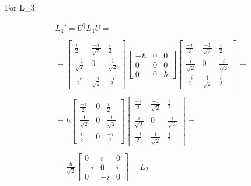 For L_3:

\begin{equation}
  \begin{array}{c}
    L_3' = U^\dagger L_3 U =
    \\

    \\
    = \left[\begin{matrix}
      \frac{i}{2} & \frac{-i}{\sqrt{2}} & \frac{i}{2}\\
      \frac{-1}{\sqrt{2}} & 0 & \frac{1}{\sqrt{2}}\\
      \frac{-i}{2} & \frac{-i}{\sqrt{2}} & \frac{-i}{2}
    \end{matrix}\right]
    \left[\begin{matrix}
      -\hbar & 0 & 0\\
      0 & 0 & 0\\
      0 & 0 & \hbar
    \end{matrix}\right]
    \left[\begin{matrix}
      \frac{-i}{2} & \frac{-1}{\sqrt{2}} & \frac{i}{2}\\
      \frac{i}{\sqrt{2}} & 0 & \frac{i}{\sqrt{2}}\\
      \frac{-i}{2} & \frac{1}{\sqrt{2}} & \frac{i}{2}
    \end{matrix}\right] =
    \\

    \\
    = \hbar\left[\begin{matrix}
      \frac{-i}{2} & 0 & \frac{i}{2}\\
      \frac{1}{\sqrt{2}} & 0 & \frac{1}{\sqrt{2}}\\
      \frac{i}{2} & 0 & \frac{-i}{2}
    \end{matrix}\right]\left[\begin{matrix}
      \frac{-i}{2} & \frac{-1}{\sqrt{2}} & \frac{i}{2}\\
      \frac{i}{\sqrt{2}} & 0 & \frac{i}{\sqrt{2}}\\
      \frac{-i}{2} & \frac{1}{\sqrt{2}} & \frac{i}{2}
    \end{matrix}\right]=
    \\

    \\
    = \frac{\hbar}{\sqrt{2}}\left[\begin{matrix}
      0 & i & 0\\
      -i & 0 & i\\
      0 & -i & 0
    \end{matrix}\right] = L_2
  \end{array}
\end{equation}

